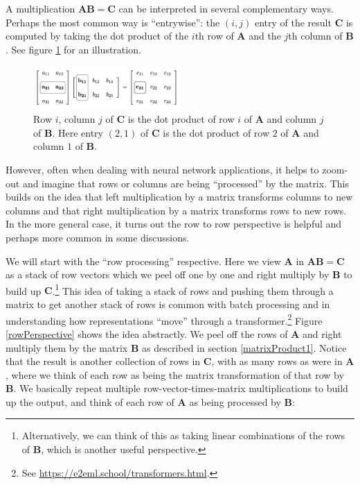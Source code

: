 A multiplication $\mathbf{A}\mathbf{B} = \mathbf{C}$ can be interpreted in several complementary ways. Perhaps the most common way is ``entrywise'': the $(i,j)$ entry of the result $\mathbf{C}$ is computed by taking the dot product of the $i$th row of $\mathbf{A}$ and the $j$th column of $\mathbf{B}$. See figure \ref{entryWiseMatrixProduct} for an illustration. 

\begin{figure}[h]
\centering
\includegraphics[width=0.5\textwidth]{images/matrixProductEntryWise.png}
\caption[Jeff Yoshimi.]{Row $i$, column $j$ of $\mathbf{C}$ is the dot product of row $i$ of $\mathbf{A}$ and column $j$ of $\mathbf{B}$. Here entry $(2,1)$ of $\mathbf{C}$ is the dot product of row $2$ of $\mathbf{A}$ and column $1$ of $\mathbf{B}$.}
\label{entryWiseMatrixProduct}
\end{figure}

However, often when dealing with neural network applications, it helps to zoom-out and imagine that rows or columns are being ``processed'' by the matrix. This builds on the idea that left multiplication by a matrix transforms columns to 
new columns and that right multiplication by a matrix transforms rows to new 
rows. In the more general case, it turns out the row to row perspective is 
helpful and perhaps more common in some discussions. 

We will start with the ``row processing'' respective. Here we view $\mathbf{A}$ in  $\mathbf{A}\mathbf{B} = \mathbf{C}$ as a stack of row vectors which we peel off one by one and right multiply by $\mathbf{B}$ to build up $\mathbf{C}$.\footnote{Alternatively, we can think of this as taking linear combinations of the rows of $\mathbf{B}$, which is another useful perspective.} This idea of taking a stack of rows and pushing them through a matrix to get another stack of rows is common with batch processing and in understanding how representations ``move'' through a transformer.\footnote{See \url{ https://e2eml.school/transformers.html}.} Figure \ref{rowPerspective} shows the idea abstractly. We peel off the rows of $\mathbf{A}$ and right multiply them by the matrix $\mathbf{B}$ as described in section \ref{matrixProduct1}. Notice that the result is another collection of rows in $\mathbf{C}$, with as many rows as were in $\mathbf{A}$, where we think of each row as being the matrix transformation of that row by $\mathbf{B}$. We basically repeat multiple row-vector-times-matrix multiplications to build up the output, and think of each row of $\mathbf{A}$ as being processed by $\mathbf{B}$:

